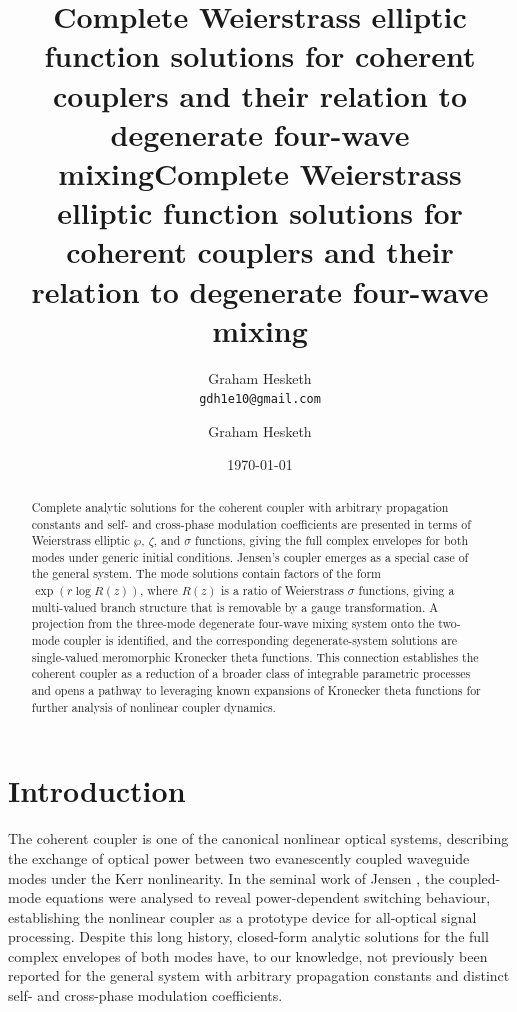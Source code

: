 \documentclass[11pt,a4paper]{article}
\numberwithin{equation}{section}
\begin{document}
\ifpreprint
  \title{Complete Weierstrass elliptic function solutions for coherent couplers and their relation to degenerate four-wave mixing}
  \author{Graham Hesketh \\
  \small \texttt{gdh1e10@gmail.com}}
  \date{\today}
  \maketitle
\else
  \title{Complete Weierstrass elliptic function solutions for coherent couplers and their relation to degenerate four-wave mixing}
  
  \author{Graham Hesketh}


\fi


\begin{abstract}
Complete analytic solutions for the coherent coupler with arbitrary propagation constants and self- and cross-phase modulation coefficients are presented in terms of Weierstrass elliptic $\wp$, $\zeta$, and $\sigma$ functions, giving the full complex envelopes for both modes under generic initial conditions. 
Jensen's coupler emerges as a special case of the general system. 
The mode solutions contain factors of the form $\exp(r\log R(z))$, where $R(z)$ is a ratio of Weierstrass $\sigma$ functions, giving a multi-valued branch structure that is removable by a gauge transformation. 
A projection from the three-mode degenerate four-wave mixing system onto the two-mode coupler is identified, and the corresponding degenerate-system solutions are single-valued meromorphic Kronecker theta functions. 
This connection establishes the coherent coupler as a reduction of a broader class of integrable parametric processes and opens a pathway to leveraging known expansions of Kronecker theta functions for further analysis of nonlinear coupler dynamics.
\end{abstract}



\section{Introduction}

The coherent coupler is one of the canonical nonlinear optical systems, describing the exchange of optical power between two evanescently coupled waveguide modes under the Kerr nonlinearity. 
In the seminal work of Jensen \cite{jensenNonlinearCoherentCoupler1982}, the coupled-mode equations were analysed to reveal power-dependent switching behaviour, establishing the nonlinear coupler as a prototype device for all-optical signal processing. 
Despite this long history, closed-form analytic solutions for the full complex envelopes of both modes have, to our knowledge, not previously been reported for the general system with arbitrary propagation constants and distinct self- and cross-phase modulation coefficients.
\end{document}
